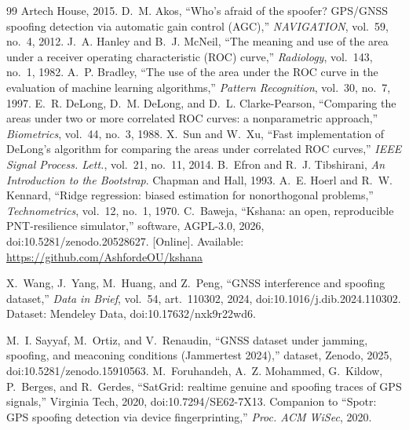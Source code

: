 \documentclass[conference]{IEEEtran}
\begin{document}
\begin{thebibliography}{99}
Artech House, 2015.
 D.~M. Akos, ``Who's afraid of the spoofer? GPS/GNSS spoofing
detection via automatic gain control (AGC),'' \emph{NAVIGATION}, vol.~59, no.~4,
2012.
 J.~A. Hanley and B.~J. McNeil, ``The meaning and use of the area
under a receiver operating characteristic (ROC) curve,'' \emph{Radiology},
vol.~143, no.~1, 1982.
 A.~P. Bradley, ``The use of the area under the ROC curve in the
evaluation of machine learning algorithms,'' \emph{Pattern Recognition}, vol.~30,
no.~7, 1997.
 E.~R. DeLong, D.~M. DeLong, and D.~L. Clarke-Pearson, ``Comparing
the areas under two or more correlated ROC curves: a nonparametric approach,''
\emph{Biometrics}, vol.~44, no.~3, 1988.
 X.~Sun and W.~Xu, ``Fast implementation of DeLong's algorithm for
comparing the areas under correlated ROC curves,'' \emph{IEEE Signal Process.
Lett.}, vol.~21, no.~11, 2014.
 B.~Efron and R.~J. Tibshirani, \emph{An Introduction to the
Bootstrap}. Chapman and Hall, 1993.
 A.~E. Hoerl and R.~W. Kennard, ``Ridge regression: biased
estimation for nonorthogonal problems,'' \emph{Technometrics}, vol.~12, no.~1, 1970.
 C.~Baweja, ``Kshana: an open, reproducible PNT-resilience
simulator,'' software, AGPL-3.0, 2026, doi:10.5281/zenodo.20528627. [Online].
Available: \url{https://github.com/AshfordeOU/kshana}

 X.~Wang, J.~Yang, M.~Huang, and Z.~Peng, ``GNSS interference and
spoofing dataset,'' \emph{Data in Brief}, vol.~54, art.~110302, 2024,
doi:10.1016/j.dib.2024.110302. Dataset: Mendeley Data,
doi:10.17632/nxk9r22wd6.

 M.~I. Sayyaf, M.~Ortiz, and V.~Renaudin, ``GNSS dataset
under jamming, spoofing, and meaconing conditions (Jammertest 2024),'' dataset,
Zenodo, 2025, doi:10.5281/zenodo.15910563.
 M.~Foruhandeh, A.~Z. Mohammed, G.~Kildow, P.~Berges, and R.~Gerdes,
``SatGrid: realtime genuine and spoofing traces of GPS signals,'' Virginia Tech, 2020,
doi:10.7294/SE62-7X13. Companion to ``Spotr: GPS spoofing detection via device
fingerprinting,'' \emph{Proc. ACM WiSec}, 2020.
\end{thebibliography}
\end{document}
